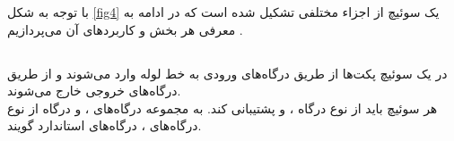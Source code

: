 با توجه به شکل \ref{fig4} یک سوئیچ  از اجزاء مختلفی تشکیل شده است که در ادامه به معرفی هر بخش و کاربرد‌های آن می‌پردازیم \cite{spec}.

\subsection{}
در یک سوئیچ  پکت‌ها از طریق درگاه‌های ورودی به خط لوله وارد می‌شوند و از طریق درگاه‌های خروجی خارج می‌شوند.\\
هر سوئیچ  باید از نوع درگاه ،  و  پشتیبانی کند. به مجموعه درگاه‌های ،  و درگاه  از نوع درگاه‌های ، درگاه‌های استاندارد گویند.

